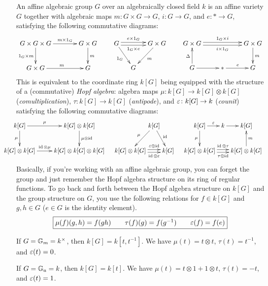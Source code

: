
An affine algebraic group $G$ over an algebraically closed field $k$ is an affine variety $G$ together with algebraic maps $m\colon G\times G\to G$, $i\colon G\to G$, and $e\colon \ast\to G$, satisfying the following commutative diagrams:
\[
 \xymatrix@C+1pc{
  G\times G\times G\ar[r]^-{m\times 1_G}\ar[d]_{1_G\times m} & G\times G\ar[d]^m\\
  G\times G\ar[r]^m & G
 }\qquad
 \xymatrix@C-1pc{
  G \ar[dr]_{1_G} \ar@<.5ex>[rr]^-{e\times 1_G} \ar@<-.5ex>[rr]_-{1_G\times e} & & G\times G \ar[dl]^m\\
  & G
 }\qquad
 \xymatrix{
  G\times G\ar@<.5ex>[rr]^-{1_G\times i} \ar@<-.5ex>[rr]_-{i\times 1_G} & & G\times G\ar[d]^m\\
  G\ar[r] \ar[u]^\Delta &\ast\ar[r]^e & G
}\]
This is equivalent to the coordinate ring $k[G]$ being equipped with the structure of a (commutative) \emph{Hopf algebra}: algebra maps $\mu\colon k[G]\to k[G]\otimes k[G]$ (\emph{comultiplication}), $\tau\colon k[G]\to k[G]$ (\emph{antipode}), and $\varepsilon\colon k[G]\to k$ (\emph{counit}) satisfying the following commutative diagrams:
\[\hspace{-2pc}\xymatrix{
 k[G]\ar[r]^-\mu \ar[d]_\mu & k[G]\otimes k[G]\ar[d]^{\mu\otimes \id}\\
 k[G]\otimes k[G] \ar[r]^-{\id\otimes\mu} & k[G]\otimes k[G]\otimes k[G]
 }\quad
 \xymatrix@C-2.2pc{
  & k[G]\ar[dl]_\mu\ar[dr]^\id\\
  k[G]\otimes k[G]\ar@<.5ex>[rr]^-{\e\otimes \id}\ar@<-.5ex>[rr]_-{\id\otimes\e} & & k[G]
 }\quad
 \xymatrix@C-1.7pc{
  k[G]\ar[r]^-\e\ar[d]_\mu & k\ar[r] & k[G]\\
  k[G]\otimes k[G] \ar@<.5ex>[rr]^-{\id\otimes\tau}\ar@<-.5ex>[rr]_{\tau\otimes\id} & & k[G]\otimes k[G]\ar[u]_m
}\]
Basically, if you're working with an affine algebraic group, you can forget the group and just remember the Hopf algebra structure on its ring of regular functions. To go back and forth between the Hopf algebra structure on $k[G]$ and the group structure on $G$, you use the following relations for $f\in k[G]$ and $g,h\in G$ ($e\in G$ is the identity element).
\[
 \fbox{$\mu(f)(g,h)=f(gh)\qquad \tau(f)(g)=f(g^{-1})\qquad \varepsilon(f)=f(e)$}
\]

\begin{example}
 If $G=\mathbb{G}_m=k^\times$, then $k[G]=k[t,t^{-1}]$. We have $\mu(t)=t\otimes t$, $\tau(t)=t^{-1}$, and $\varepsilon(t)=0$.
\end{example}
\begin{example}
 If $G=\mathbb{G}_a=k$, then $k[G]=k[t]$. We have $\mu(t)=t\otimes 1+1\otimes t$, $\tau(t)=-t$, and $\varepsilon(t)=1$.
\end{example}


